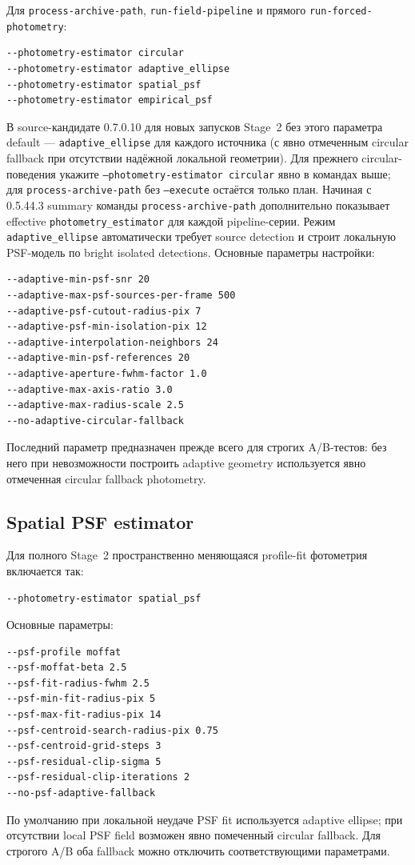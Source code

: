 Для \texttt{process-archive-path}, \texttt{run-field-pipeline} и прямого \texttt{run-forced-photometry}:
\begin{lstlisting}
--photometry-estimator circular
--photometry-estimator adaptive_ellipse
--photometry-estimator spatial_psf
--photometry-estimator empirical_psf
\end{lstlisting}
В source-кандидате 0.7.0.10 для новых запусков Stage~2 без этого параметра default ---
\texttt{adaptive\_ellipse} для каждого источника (с явно отмеченным circular fallback при
отсутствии надёжной локальной геометрии). Для прежнего circular-поведения укажите
\texttt{--photometry-estimator circular} явно в командах выше; для
\texttt{process-archive-path} без \texttt{--execute} остаётся только план.
Начиная с 0.5.44.3 summary команды \texttt{process-archive-path} дополнительно показывает effective
\texttt{photometry\_estimator} для каждой pipeline-серии. Режим
\texttt{adaptive\_ellipse} автоматически требует source detection и строит локальную PSF-модель
по bright isolated detections. Основные параметры настройки:
\begin{lstlisting}
--adaptive-min-psf-snr 20
--adaptive-max-psf-sources-per-frame 500
--adaptive-psf-cutout-radius-pix 7
--adaptive-psf-min-isolation-pix 12
--adaptive-interpolation-neighbors 24
--adaptive-min-psf-references 20
--adaptive-aperture-fwhm-factor 1.0
--adaptive-max-axis-ratio 3.0
--adaptive-max-radius-scale 2.5
--no-adaptive-circular-fallback
\end{lstlisting}
Последний параметр предназначен прежде всего для строгих A/B-тестов: без него при невозможности
построить adaptive geometry используется явно отмеченная circular fallback photometry.

\subsection{Spatial PSF estimator}
Для полного Stage~2 пространственно меняющаяся profile-fit фотометрия включается так:
\begin{lstlisting}
--photometry-estimator spatial_psf
\end{lstlisting}
Основные параметры:
\begin{lstlisting}
--psf-profile moffat
--psf-moffat-beta 2.5
--psf-fit-radius-fwhm 2.5
--psf-min-fit-radius-pix 5
--psf-max-fit-radius-pix 14
--psf-centroid-search-radius-pix 0.75
--psf-centroid-grid-steps 3
--psf-residual-clip-sigma 5
--psf-residual-clip-iterations 2
--no-psf-adaptive-fallback
\end{lstlisting}
По умолчанию при локальной неудаче PSF fit используется adaptive ellipse; при отсутствии local
PSF field возможен явно помеченный circular fallback. Для строгого A/B оба fallback можно
отключить соответствующими параметрами.


